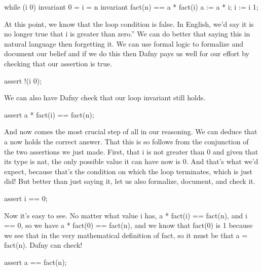 \documentclass[letterpaper,10pt,english]{sphinxmanual}
\begin{document}
\begin{sphinxVerbatim}[commandchars=\\\{\}]
while (i \PYGZgt{}  0)
    invariant 0 \PYGZlt{}= i \PYGZlt{}= n
    invariant fact(n) == a * fact(i)
\PYGZob{}
    a := a * i;
    i := i \PYGZhy{} 1;
\PYGZcb{}
\end{sphinxVerbatim}

At this point, we know that the loop condition is false. In English,
we’d say it is no longer true that i is greater than zero.” We can do
better that saying this in natural language then forgetting it. We can
use formal logic to formalize and document our belief and if we do
this then Dafny pays us well for our effort by checking that our
assertion is true.

\begin{sphinxVerbatim}[commandchars=\\\{\}]
assert !(i \PYGZgt{} 0);
\end{sphinxVerbatim}

We can also have Dafny check that our loop invariant still holds.

\begin{sphinxVerbatim}[commandchars=\\\{\}]
assert a * fact(i) == fact(n);
\end{sphinxVerbatim}

And now comes the most crucial step of all in our reasoning. We can
deduce that a now holds the correct answer. That this is so follows
from the conjunction of the two assertions we just made. First, that i
is not greater than 0 and given that its type is nat, the only
possible value it can have now is 0. And that’s what we’d expect,
because that’s the condition on which the loop terminates, which is
just did! But better than just saying it, let us also formalize,
document, and check it.

\begin{sphinxVerbatim}[commandchars=\\\{\}]
assert i == 0;
\end{sphinxVerbatim}

Now it’s easy to see. No matter what value i has, a * fact(i) ==
fact(n), and i == 0, so we have a * fact(0) == fact(n), and we know
that fact(0) is 1 because we see that in the very mathematical
definition of fact, so it must be that a = fact(n). Dafny can check!

\begin{sphinxVerbatim}[commandchars=\\\{\}]
assert a == fact(n);
\end{sphinxVerbatim}
\end{document}
